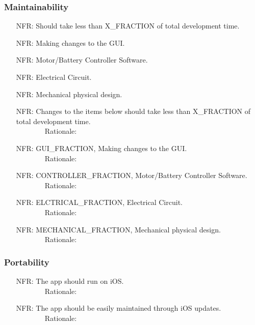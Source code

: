 \documentclass[12pt]{article}
\newcounter{nfrnum} %
\begin{document}
\subsubsection{Maintainability}
\begin{itemize}
\setlength{\itemindent}{.5in}
\item[NFR\refstepcounter{nfrnum}\thenfrnum\label{NFR17}:] Should take less than X\_FRACTION of total development time.
\item[NFR\refstepcounter{nfrnum}\thenfrnum\label{NFR18}:] Making changes to the GUI.
\item[NFR\refstepcounter{nfrnum}\thenfrnum\label{NFR19}:] Motor/Battery Controller Software.
\item[NFR\refstepcounter{nfrnum}\thenfrnum\label{NFR20}:] Electrical Circuit.
\item[NFR\refstepcounter{nfrnum}\thenfrnum\label{NFR21}:] Mechanical physical design.
\item[NFR\refstepcounter{nfrnum}\thenfrnum\label{NFR17}:] Changes to the items below should take less than X\_FRACTION of total development time.
\\ \-\ \-\ \-\ \-\ \-\ \-\ \-\ \-\ Rationale: 
\item[NFR\refstepcounter{nfrnum}\thenfrnum\label{NFR18}:] GUI\_FRACTION, Making changes to the GUI.
\\ \-\ \-\ \-\ \-\ \-\ \-\ \-\ \-\ Rationale: 
\item[NFR\refstepcounter{nfrnum}\thenfrnum\label{NFR19}:] CONTROLLER\_FRACTION, Motor/Battery Controller Software.
\\ \-\ \-\ \-\ \-\ \-\ \-\ \-\ \-\ Rationale: 
\item[NFR\refstepcounter{nfrnum}\thenfrnum\label{NFR20}:] ELCTRICAL\_FRACTION, Electrical Circuit.
\\ \-\ \-\ \-\ \-\ \-\ \-\ \-\ \-\ Rationale: 
\item[NFR\refstepcounter{nfrnum}\thenfrnum\label{NFR21}:] MECHANICAL\_FRACTION, Mechanical physical design.
\\ \-\ \-\ \-\ \-\ \-\ \-\ \-\ \-\ Rationale: 
\end{itemize}

\subsubsection{Portability}
\begin{itemize}
\setlength{\itemindent}{.5in}
\item[NFR\refstepcounter{nfrnum}\thenfrnum\label{NFR22}:] The app should run on iOS.
\\ \-\ \-\ \-\ \-\ \-\ \-\ \-\ \-\ Rationale: 
\item[NFR\refstepcounter{nfrnum}\thenfrnum\label{NFR23}:] The app should be easily maintained through iOS updates.
\\ \-\ \-\ \-\ \-\ \-\ \-\ \-\ \-\ Rationale: 
\end{itemize}
\end{document}
